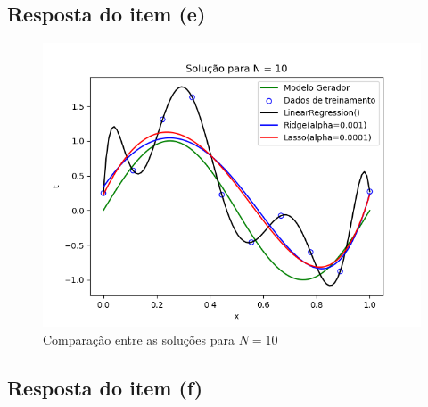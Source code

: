 \subsection{Resposta do item (e)}
\begin{figure}[H]
    \centering
    \caption{Comparação entre as soluções para $N=10$}
    \includegraphics[width=12cm]{E1_e.png}
\end{figure}

\subsection{Resposta do item (f)}

